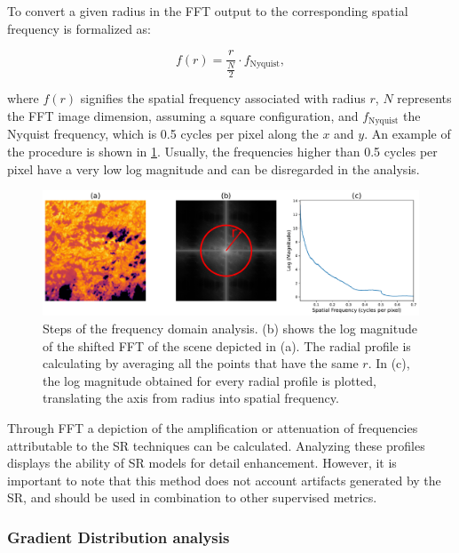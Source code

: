         
        To convert a given radius in the FFT output to the corresponding spatial frequency is formalized as:

        \begin{equation}
            f(r) = \frac{r}{\frac{N}{2}} \cdot f_{\text{Nyquist}},
        \end{equation}

        where \( f(r) \) signifies the spatial frequency associated with radius \( r \), \( N \) represents the FFT image dimension, assuming a square configuration, and \( f_{\text{Nyquist}} \) the Nyquist frequency, which is 0.5 cycles per pixel along the $x$ and $y$. An example of the procedure is shown in \ref{fig:4-frequency-analysis}. Usually, the frequencies higher than 0.5 cycles per pixel have a very low log magnitude and can be disregarded in the analysis.

        \begin{figure}[H]
            \centering
            \includegraphics[width=\linewidth]{Includes/4-frequency-analysis.pdf}
            \caption{Steps of the frequency domain analysis. (b) shows the log magnitude of the shifted FFT of the scene depicted in (a). The radial profile is calculating by averaging all the points that have the same $r$. In (c), the log magnitude obtained for every radial profile is plotted, translating the axis from radius into spatial frequency.}
            \label{fig:4-frequency-analysis}
        \end{figure}
        

        Through FFT a depiction of the amplification or attenuation of frequencies attributable to the SR techniques can be calculated. 
        Analyzing these profiles displays the ability of SR models for detail enhancement. 
        However, it is important to note that this method does not account artifacts generated by the SR, and should be used in combination to other supervised metrics.

        \subsubsection{Gradient Distribution analysis}


